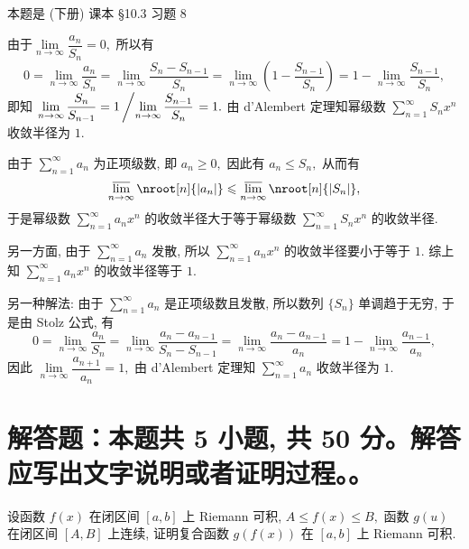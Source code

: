 \begin{solution}
本题是 (下册) 课本 \S 10.3 习题 8

由于$\lim\limits_{n\to\infty} \dfrac{a_n}{S_n} = 0,$ 所以有
\[0 = \lim\limits_{n\to\infty} \dfrac{a_n}{S_n} = \lim\limits_{n\to\infty} \dfrac{S_n - S_{n-1}}{S_n} = \lim\limits_{n\to\infty} \left( 1 - \dfrac{S_{n-1}}{S_n} \right) = 1 - \lim\limits_{n\to\infty} \dfrac{S_{n-1}}{S_n},\]
即知 $\lim\limits_{n\to\infty} \dfrac{S_n}{S_{n-1}} = 1 \left/ \lim\limits_{n\to\infty} \dfrac{S_{n-1}}{S_n} \right. = 1.$ 由 d'Alembert 定理知幂级数 $\sum\limits_{n=1}^{\infty} S_n x^n$ 收敛半径为 $1.$

由于 $\sum\limits_{n=1}^{\infty} a_n$ 为正项级数, 即 $a_n \geqslant 0,$ 因此有 $a_n \leqslant S_n,$ 从而有
\[\varlimsup_{n\to\infty} \nroot[n]{\lvert a_n \rvert} \leqslant \varlimsup_{n\to\infty} \nroot[n]{\lvert S_n \rvert},\]
于是幂级数 $\sum\limits_{n=1}^{\infty} a_n x^n$ 的收敛半径大于等于幂级数 $\sum\limits_{n=1}^{\infty} S_n x^n$ 的收敛半径.

另一方面, 由于 $\sum\limits_{n=1}^{\infty} a_n$ 发散, 所以 $\sum\limits_{n=1}^{\infty} a_n x^n$ 的收敛半径要小于等于 $1.$ 综上知 $\sum\limits_{n=1}^{\infty} a_n x^n$ 的收敛半径等于 $1.$

另一种解法: 由于 $\sum\limits_{n=1}^{\infty} a_n$ 是正项级数且发散, 所以数列 $\{S_n\}$ 单调趋于无穷, 于是由 Stolz 公式, 有
\[0 = \lim\limits_{n\to\infty} \dfrac{a_n}{S_n} = \lim\limits_{n\to\infty} \dfrac{a_n-a_{n-1}}{S_n-S_{n-1}} = \lim\limits_{n\to\infty} \dfrac{a_n-a_{n-1}}{a_n} = 1 -\lim\limits_{n\to\infty} \dfrac{a_{n-1}}{a_n},\]
因此 $\lim\limits_{n\to\infty} \dfrac{a_{n+1}}{a_n} = 1,$ 由 d'Alembert 定理知 $\sum\limits_{n=1}^{\infty} a_n$ 收敛半径为 $1.$
\end{solution}


\section{解答题：本题共 5 小题, 共 50 分。解答应写出文字说明或者证明过程。。}


\begin{question}[points = 8]
设函数 $f(x)$ 在闭区间 $[a, b]$ 上 Riemann 可积, $A \leqslant f(x) \leqslant B,$ 函数 $g(u)$ 在闭区间 $[A, B]$ 上连续, 证明复合函数 $g(f(x))$ 在 $[a, b]$ 上 Riemann 可积.

\end{question}

